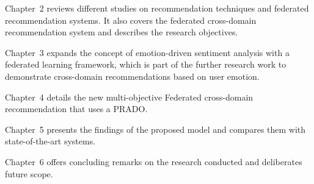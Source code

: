 Chapter~2 reviews different studies on recommendation techniques and federated recommendation systems. It also covers the federated cross-domain recommendation system and describes the research objectives.

Chapter~3 expands the concept of emotion-driven sentiment analysis with a federated learning framework, which is part of the further research work to demonstrate cross-domain recommendations based on user emotion.

Chapter~4 details the new multi-objective Federated cross-domain recommendation that uses a PRADO.

Chapter~5 presents the findings of the proposed model and compares them with state-of-the-art systems.

Chapter~6 offers concluding remarks on the research conducted and deliberates future scope.
